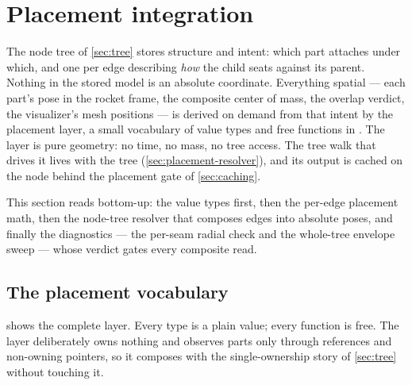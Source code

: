 
\section{Placement integration}\label{sec:placement}

The node tree of \cref{sec:tree} stores structure and intent: which part attaches under which, and
one  per edge describing \emph{how} the child seats against its parent. Nothing in
the stored model is an absolute coordinate. Everything spatial --- each part's pose in the rocket
frame, the composite center of mass, the overlap verdict, the visualizer's mesh positions --- is
derived on demand from that intent by the placement layer, a small vocabulary of value types and
free functions in . The layer is pure geometry: no time, no mass,
no tree access. The tree walk that drives it lives with the tree (\cref{sec:placement-resolver}),
and its output is cached on the node behind the placement gate of \cref{sec:caching}.

This section reads bottom-up: the value types first, then the per-edge placement math, then the
node-tree resolver that composes edges into absolute poses, and finally the diagnostics --- the
per-seam radial check and the whole-tree envelope sweep --- whose verdict gates every composite
read.

\subsection{The placement vocabulary}\label{sec:placement-vocab}

 shows the complete layer. Every type is a plain value; every function is
free. The layer deliberately owns nothing and observes parts only through  references
and non-owning pointers, so it composes with the single-ownership story of \cref{sec:tree} without
touching it.


